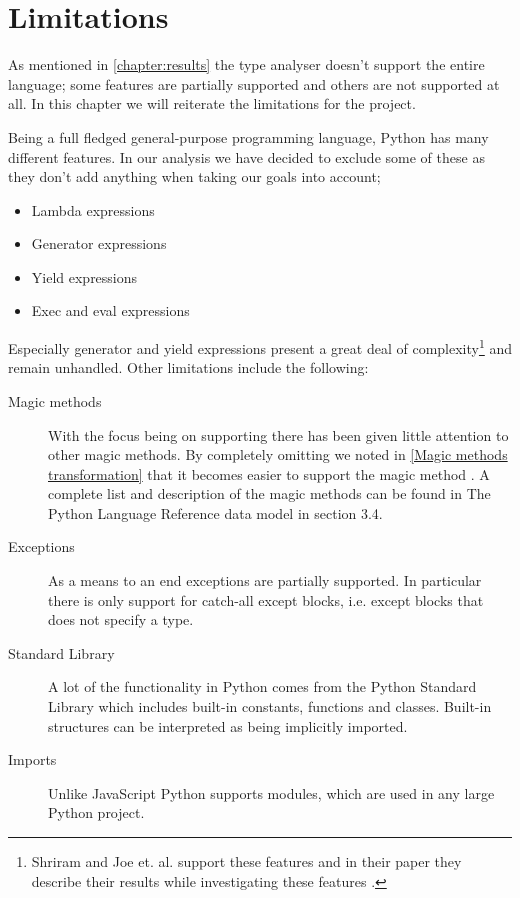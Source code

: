 \chapter{Limitations}
As mentioned in \autoref{chapter:results} the type analyser doesn't support the entire language; some features are partially supported and others are not supported at all. In this chapter we will reiterate the limitations for the project.

Being a full fledged general-purpose programming language, Python has many different features. In our analysis we have decided to exclude some of these as they don't add anything when taking our goals into account;

\begin{itemize}
	\item Lambda expressions
	\item Generator expressions
	\item Yield expressions
    \item Exec and eval expressions
\end{itemize}

Especially generator and yield expressions present a great deal of complexity\footnote{Shriram and Joe et. al. support these features and in their paper they describe their results while investigating these features \cite{lambdapy}.} and remain unhandled. Other limitations include the following:

\begin{description}
	\item[Magic methods] With the focus being on supporting  there has been given little attention to other magic methods. By completely omitting  we noted in \autoref{Magic methods transformation} that it becomes easier to support the magic method . A complete list and description of the magic methods can be found in The Python Language Reference data model \cite{pyref.datamodel} in section 3.4.
	\item[Exceptions] As a means to an end exceptions are partially supported. In particular there is only support for catch-all except blocks, i.e. except blocks that does not specify a type.
	\item[Standard Library] A lot of the functionality in Python comes from the Python Standard Library which includes built-in constants, functions and classes. Built-in structures can be interpreted as being implicitly imported.
	\item[Imports] Unlike JavaScript Python supports modules, which are used in any large Python project.
\end{description}